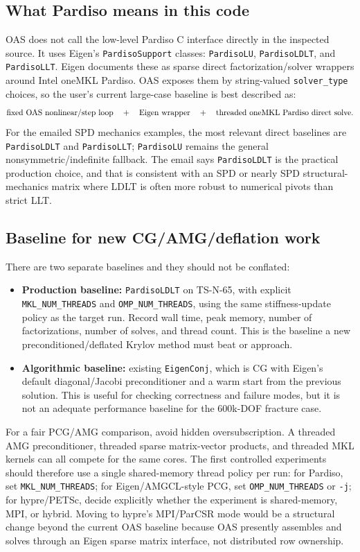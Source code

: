 \documentclass[10pt,a4paper]{article}
\newcommand{\code}[1]{\texttt{#1}}
\begin{document}
\subsection*{What Pardiso means in this code}

OAS does not call the low-level Pardiso C interface directly in the inspected source. It uses Eigen's \code{PardisoSupport} classes: \code{PardisoLU}, \code{PardisoLDLT}, and \code{PardisoLLT}. Eigen documents these as sparse direct factorization/solver wrappers around Intel oneMKL Pardiso. OAS exposes them by string-valued \code{solver\_type} choices, so the user's current large-case baseline is best described as:
\[
\hbox{fixed OAS nonlinear/step loop} \quad + \quad \hbox{Eigen wrapper} \quad + \quad \hbox{threaded oneMKL Pardiso direct solve.}
\]
For the emailed SPD mechanics examples, the most relevant direct baselines are \code{PardisoLDLT} and \code{PardisoLLT}; \code{PardisoLU} remains the general nonsymmetric/indefinite fallback. The email says \code{PardisoLDLT} is the practical production choice, and that is consistent with an SPD or nearly SPD structural-mechanics matrix where LDLT is often more robust to numerical pivots than strict LLT.

\subsection*{Baseline for new CG/AMG/deflation work}

There are two separate baselines and they should not be conflated:
\begin{itemize}
  \item \textbf{Production baseline:} \code{PardisoLDLT} on TS-N-65, with explicit \code{MKL\_NUM\_THREADS} and \code{OMP\_NUM\_THREADS}, using the same stiffness-update policy as the target run. Record wall time, peak memory, number of factorizations, number of solves, and thread count. This is the baseline a new preconditioned/deflated Krylov method must beat or approach.
  \item \textbf{Algorithmic baseline:} existing \code{EigenConj}, which is CG with Eigen's default diagonal/Jacobi preconditioner and a warm start from the previous solution. This is useful for checking correctness and failure modes, but it is not an adequate performance baseline for the 600k-DOF fracture case.
\end{itemize}

For a fair PCG/AMG comparison, avoid hidden oversubscription. A threaded AMG preconditioner, threaded sparse matrix-vector products, and threaded MKL kernels can all compete for the same cores. The first controlled experiments should therefore use a single shared-memory thread policy per run: for Pardiso, set \code{MKL\_NUM\_THREADS}; for Eigen/AMGCL-style PCG, set \code{OMP\_NUM\_THREADS} or \code{-j}; for hypre/PETSc, decide explicitly whether the experiment is shared-memory, MPI, or hybrid. Moving to hypre's MPI/ParCSR mode would be a structural change beyond the current OAS baseline because OAS presently assembles and solves through an Eigen sparse matrix interface, not distributed row ownership.
\end{document}
